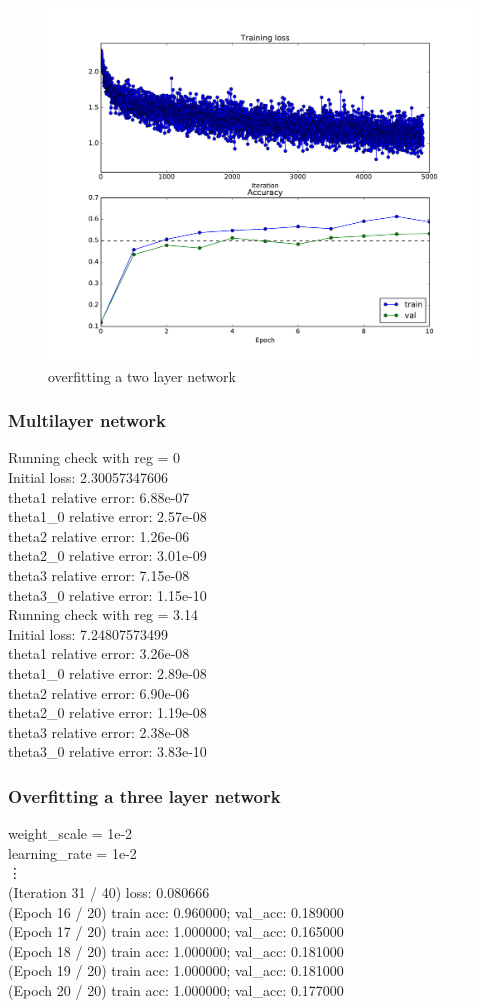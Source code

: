 \documentclass{article}
\begin{document}
\begin{figure}[H]
\centering
\includegraphics[width=0.5\linewidth]{./figure_3_1_6}
\caption{overfitting a two layer network}
\label{fig:3_1_6}
\end{figure}

\subsubsection{Multilayer network}
{\footnotesize
Running check with reg =  0\\
Initial loss:  2.30057347606\\
theta1 relative error: 6.88e-07\\
theta1\_0 relative error: 2.57e-08\\
theta2 relative error: 1.26e-06\\
theta2\_0 relative error: 3.01e-09\\
theta3 relative error: 7.15e-08\\
theta3\_0 relative error: 1.15e-10\\
Running check with reg =  3.14\\
Initial loss:  7.24807573499\\
theta1 relative error: 3.26e-08\\
theta1\_0 relative error: 2.89e-08\\
theta2 relative error: 6.90e-06\\
theta2\_0 relative error: 1.19e-08\\
theta3 relative error: 2.38e-08\\
theta3\_0 relative error: 3.83e-10\\
}

\subsubsection{Overfitting a three layer network}
{\footnotesize
weight\_scale = 1e-2\\
learning\_rate = 1e-2\\
\vdots\\
(Iteration 31 / 40) loss: 0.080666\\
(Epoch 16 / 20) train acc: 0.960000; val\_acc: 0.189000\\
(Epoch 17 / 20) train acc: 1.000000; val\_acc: 0.165000\\
(Epoch 18 / 20) train acc: 1.000000; val\_acc: 0.181000\\
(Epoch 19 / 20) train acc: 1.000000; val\_acc: 0.181000\\
(Epoch 20 / 20) train acc: 1.000000; val\_acc: 0.177000\\
}
\end{document}
